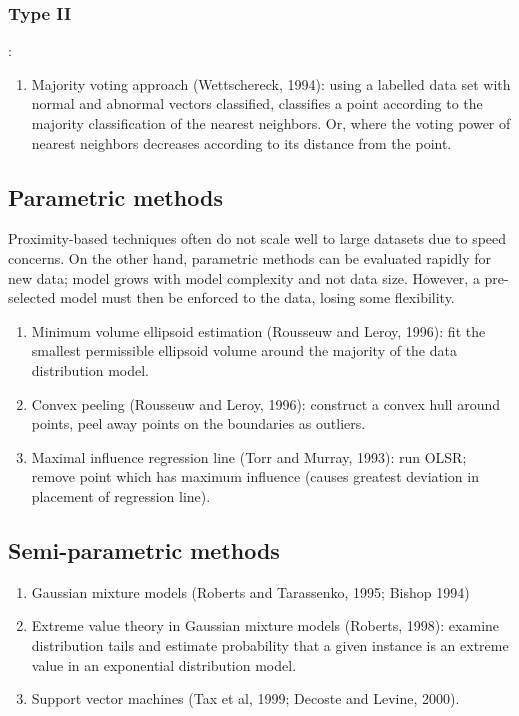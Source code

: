 \documentclass[11pt]{article}
\begin{document}
\subsubsection{Type II}:
\begin{enumerate}
\item Majority voting approach (Wettschereck, 1994): using a labelled data set with normal and abnormal vectors classified, classifies a point according to the majority classification of the nearest neighbors. Or, where the voting power of nearest neighbors decreases according to its distance from the point.
\end{enumerate}

\subsection{Parametric methods}
Proximity-based techniques often do not scale well to large datasets due to speed concerns. On the other hand, parametric methods can be evaluated rapidly for new data; model grows with model complexity and not data size. However, a pre-selected model must then be enforced to the data, losing some flexibility. 

\begin{enumerate}
\item Minimum volume ellipsoid estimation (Rousseuw and Leroy, 1996): fit the smallest permissible ellipsoid volume around the majority of the data distribution model.
\item Convex peeling (Rousseuw and Leroy, 1996): construct a convex hull around points, peel away points on the boundaries as outliers.
\item Maximal influence regression line (Torr and Murray, 1993): run OLSR; remove point which has maximum influence (causes greatest deviation in placement of regression line).
\end{enumerate}

\subsection{Semi-parametric methods}
\begin{enumerate}
\item Gaussian mixture models (Roberts and Tarassenko, 1995; Bishop 1994)
\item Extreme value theory in Gaussian mixture models (Roberts, 1998): examine distribution tails and estimate probability that a given instance is an extreme value in an exponential distribution model.
\item Support vector machines (Tax et al, 1999; Decoste and Levine, 2000).
\end{enumerate}
\end{document}
